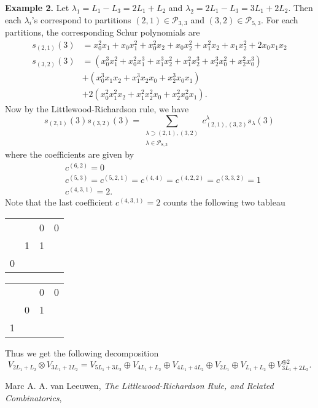 \documentclass{article}
\begin{document}
\textbf{Example 2.} Let $\lambda_{1} = L_{1} - L_{3} = 2L_{1} + L_{2}$ and $\lambda_{2} = 2L_{1} - L_{3} = 3L_{1} + 2L_{2}$. Then each $\lambda_{i}$'s correspond to partitions $(2, 1)\in \mathcal{P}_{3, 3}$ and $(3, 2)\in \mathcal{P}_{5, 3}$. For each partitions, the corresponding Schur polynomials are
\begin{align*}
s_{(2, 1)}(3) &= x_{0}^{2}x_{1} + x_{0}x_{1}^{2} + x_{0}^{2}x_{2} + x_{0}x_{2}^{2} + x_{1}^{2}x_{2} + x_{1}x_{2}^{2} + 2x_{0}x_{1}x_{2} \\
s_{(3, 2)}(3) &= (x_{0}^{3}x_{1}^{2} + x_{0}^{2}x_{1}^{3} + x_{1}^{3}x_{2}^{2} + x_{1}^{2}x_{2}^{3} + x_{2}^{3}x_{0}^{2} + x_{2}^{2}x_{0}^{3}) \\
&+ (x_{0}^{3}x_{1}x_{2} +x_{1}^{3}x_{2}x_{0} + x_{2}^{3}x_{0}x_{1}) \\
&+ 2(x_{0}^{2}x_{1}^{2}x_{2}+x_{1}^{2}x_{2}^{2}x_{0} + x_{2}^{2}x_{0}^{2}x_{1}). 
\end{align*}
Now by the Littlewood-Richardson rule, we have 
$$
s_{(2, 1)}(3)s_{(3, 2)}(3) = \sum_{\substack{\lambda\supset (2, 1), (3, 2) \\ \lambda\in \mathcal{P}_{8, 3}}}c_{(2, 1),(3, 2)}^{\lambda}s_{\lambda}(3)
$$
where the coefficients are given by 
\begin{align*}
&c^{(6, 2)} = 0 \\
&c^{(5, 3)} = c^{(5, 2, 1)} = c^{(4, 4)} = c^{(4, 2, 2)} = c^{(3, 3, 2)}  = 1 \\
&c^{(4, 3, 1)} = 2. 
\end{align*}
Note that the last coefficient $c^{(4, 3, 1)} =2$ counts the following two tableau
\begin{center}
\begin{tabular}{llll}
\cline{3-4}
                        & \multicolumn{1}{l|}{}  & \multicolumn{1}{l|}{0} & \multicolumn{1}{l|}{0} \\ \cline{2-4} 
\multicolumn{1}{l|}{}   & \multicolumn{1}{l|}{1} & \multicolumn{1}{l|}{1} &                        \\ \cline{1-3}
\multicolumn{1}{|l|}{0} &                        &                        &                        \\ \cline{1-1}
\end{tabular}\qquad\qquad
\begin{tabular}{llll}
\cline{3-4}
                        & \multicolumn{1}{l|}{}  & \multicolumn{1}{l|}{0} & \multicolumn{1}{l|}{0} \\ \cline{2-4} 
\multicolumn{1}{l|}{}   & \multicolumn{1}{l|}{0} & \multicolumn{1}{l|}{1} &                        \\ \cline{1-3}
\multicolumn{1}{|l|}{1} &                        &                        &                        \\ \cline{1-1}
\end{tabular}
\end{center}
Thus we get the following decomposition 
$$
V_{2L_{1} + L_{2}} \otimes V_{3L_{1} + 2L_{2}} = V_{5L_{1} +3L_{2}} \oplus V_{4L_{1}+L_{2}} \oplus V_{4L_{1} + 4L_{2}} \oplus V_{2L_{1}} \oplus V_{L_{1} + L_{2}} \oplus V_{3L_{1} +2L_{2}}^{\oplus 2}. 
$$

\begin{thebibliography}{5}
 Marc A. A. van Leeuwen, \emph{The Littlewood-Richardson Rule, and Related Combinatorics}, 
\end{thebibliography}
\end{document}
